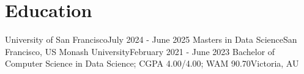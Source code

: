 \section{Education}
    \resumeSubHeadingListStart
        \resumeSubheading
      {University of San Francisco}{July 2024 - June 2025}
      {Masters in Data Science}{San Francisco, US}
  \resumeSubHeadingListEnd
    \resumeSubHeadingListStart
        \resumeSubheading
      {Monash University}{February 2021 - June 2023}
      {Bachelor of Computer Science in Data Science; CGPA 4.00/4.00; WAM 90.70}{Victoria, AU}
    \resumeItemListStart
    \resumeItemListEnd
  \resumeSubHeadingListEnd
